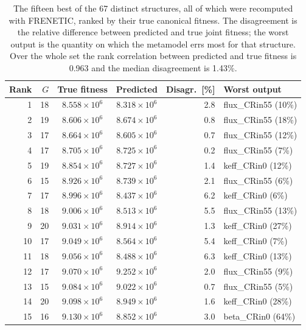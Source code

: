\begin{table}[htbp]
\centering
\caption{The fifteen best of the 67 distinct structures, all of which were
recomputed with FRENETIC, ranked by their true canonical fitness. The
disagreement is the relative difference between predicted and true joint
fitness; the worst output is the quantity on which the metamodel errs most for
that structure. Over the whole set the rank correlation between predicted and
true fitness is 0.963 and the median disagreement is 1.43\%.}
\label{tab:ranking}
\begin{tabular}{rrccrl}
\hline
Rank & $G$ & True fitness & Predicted & Disagr.\ [\%] & Worst output \\ \hline
    1 & 18 & $8.558\times10^{6}$ & $8.318\times10^{6}$ & 2.8 & flux\_CRin55 (10\%) \\
    2 & 19 & $8.606\times10^{6}$ & $8.674\times10^{6}$ & 0.8 & flux\_CRin55 (18\%) \\
    3 & 17 & $8.664\times10^{6}$ & $8.605\times10^{6}$ & 0.7 & flux\_CRin55 (12\%) \\
    4 & 17 & $8.705\times10^{6}$ & $8.725\times10^{6}$ & 0.2 & flux\_CRin55 (7\%) \\
    5 & 19 & $8.854\times10^{6}$ & $8.727\times10^{6}$ & 1.4 & keff\_CRin0 (12\%) \\
    6 & 15 & $8.926\times10^{6}$ & $8.739\times10^{6}$ & 2.1 & flux\_CRin55 (6\%) \\
    7 & 17 & $8.996\times10^{6}$ & $8.437\times10^{6}$ & 6.2 & keff\_CRin0 (6\%) \\
    8 & 18 & $9.006\times10^{6}$ & $8.513\times10^{6}$ & 5.5 & flux\_CRin55 (13\%) \\
    9 & 20 & $9.031\times10^{6}$ & $8.914\times10^{6}$ & 1.3 & keff\_CRin0 (27\%) \\
    10 & 17 & $9.049\times10^{6}$ & $8.564\times10^{6}$ & 5.4 & keff\_CRin0 (7\%) \\
    11 & 18 & $9.056\times10^{6}$ & $8.488\times10^{6}$ & 6.3 & keff\_CRin0 (13\%) \\
    12 & 17 & $9.070\times10^{6}$ & $9.252\times10^{6}$ & 2.0 & flux\_CRin55 (9\%) \\
    13 & 15 & $9.084\times10^{6}$ & $9.022\times10^{6}$ & 0.7 & flux\_CRin55 (5\%) \\
    14 & 20 & $9.098\times10^{6}$ & $8.949\times10^{6}$ & 1.6 & keff\_CRin0 (28\%) \\
    15 & 16 & $9.130\times10^{6}$ & $8.852\times10^{6}$ & 3.0 & beta\_CRin0 (64\%) \\
\hline
\end{tabular}
\end{table}
